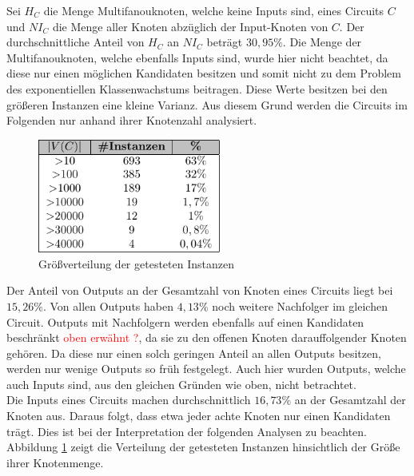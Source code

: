 \documentclass[11pt, a4paper, german]{article}
\begin{document}
Sei $H_C$ die Menge Multifanouknoten, welche keine Inputs sind, eines Circuits $C$ und $NI_C$ die Menge aller Knoten abz\"uglich der Input-Knoten von $C$. Der durchschnittliche Anteil von $H_C$ an $NI_C$ betr\"agt $30,95\%$. Die Menge der Multifanouknoten, welche ebenfalls Inputs sind, wurde hier nicht beachtet, da diese nur einen m\"oglichen Kandidaten besitzen und somit nicht zu dem Problem des exponentiellen Klassenwachstums beitragen. Diese Werte besitzen bei den gr\"o{\ss}eren Instanzen eine kleine Varianz. Aus diesem Grund werden die Circuits im Folgenden nur anhand ihrer Knotenzahl analysiert.\\
   \begin{figure}
		\includegraphics[width = 6cm]{pictures/compiled/instance_sizes_distribution_table}
		\caption{Gr\"o\ss verteilung der getesteten Instanzen}
		\label{bild:sizes_table}
	\end{figure}
 Der Anteil von Outputs an der Gesamtzahl von Knoten eines Circuits liegt bei $15,26\%$. Von allen Outputs haben $4,13\%$ noch weitere Nachfolger im gleichen Circuit. Outputs mit Nachfolgern werden ebenfalls auf einen Kandidaten beschr\"ankt \textcolor{red}{oben erw\"ahnt ?}, da sie zu den offenen Knoten darauffolgender Knoten gehören. Da diese nur einen solch geringen Anteil an allen Outputs besitzen, werden nur wenige Outputs so fr\"uh festgelegt. Auch hier wurden Outputs, welche auch Inputs sind, aus den gleichen Gr\"unden wie oben, nicht betrachtet.\\
 Die Inputs eines Circuits machen durchschnittlich $16,73\%$ an der Gesamtzahl der Knoten aus. Daraus folgt, dass etwa jeder achte Knoten nur einen Kandidaten tr\"agt. Dies ist bei der Interpretation der folgenden Analysen zu beachten.\\
 Abbildung \ref{bild:sizes_table} zeigt die Verteilung der getesteten Instanzen hinsichtlich der Größe  ihrer Knotenmenge.
 

 
\end{document}
